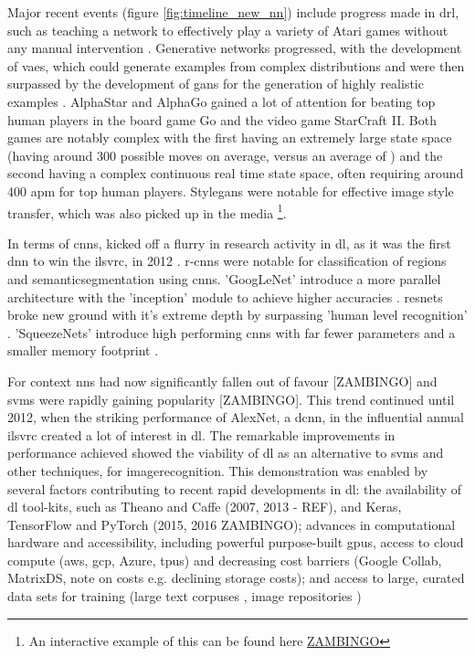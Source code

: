 Major recent events (figure \ref{fig:timeline_new_nn}) include progress made in \gls{drl}, such as teaching a network to effectively play a variety of Atari games without any manual intervention \cite{drl_atari}. Generative networks progressed, with the development of \gls{vae}s, which could generate examples from complex distributions and were then surpassed by the development of \gls{gan}s for the generation of highly realistic examples \cite{gan}. AlphaStar  \cite{alpha_star} and AlphaGo \cite{alpha_go} gained a lot of attention \cite{press_alpha_go} \cite{press_alpha_star} for beating top human players in the board game Go and the video game StarCraft II. Both games are notably complex with the first having an extremely large state space (having around 300 possible moves on average, versus an average of \cite{moves_chess_go}) and the second having a complex continuous real time state space, often requiring  around 400 \gls{apm} \cite{sc_apm} for top human players. Style\gls{gan}s were notable for effective image style transfer, which was also picked up in the media \cite{press_stylegan} \footnote{An interactive example of this can be found here \url{ZAMBINGO}}.

In terms of \gls{cnn}s, kicked off a flurry in research activity in \gls{dl}, as it was the first \gls{dnn} to win the \gls{ilsvrc}, in 2012 \cite{alex_net}. \gls{r-cnn}s were notable for classification of regions and \gls{semanticsegmentation} using \gls{cnn}s. 'GoogLeNet' introduce a more parallel architecture with the 'inception' module to achieve higher accuracies \cite{googlenet}. \gls{resnet}s broke new ground with it's extreme depth \cite{resnet} by surpassing 'human level recognition' \cite{resnet_human}. 'SqueezeNets' introduce high performing \gls{cnn}s with far fewer parameters and a smaller memory footprint \cite{squeeze_net}. 
\bigskip

For context \gls{nn}s had now significantly fallen out of favour [ZAMBINGO] and \gls{svm}s were rapidly gaining popularity [ZAMBINGO]. This trend continued until 2012, when the striking performance of AlexNet, a \gls{dcnn}, in the influential annual \gls{ilsvrc} created a lot of interest in \gls{dl}. The remarkable improvements in performance achieved showed the viability of \gls{dl} as an alternative to \gls{svm}s and other techniques, for \gls{imagerecognition}. This demonstration was enabled by several factors contributing to recent rapid developments in \gls{dl}: the availability of \gls{dl} tool-kits, such as Theano and Caffe (2007, 2013 - REF), and Keras, TensorFlow and PyTorch (2015, 2016 ZAMBINGO); advances in computational hardware and accessibility, including powerful purpose-built \gls{gpu}s, access to cloud compute (\gls{aws}, \gls{gcp}, Azure, \gls{tpu}s) and decreasing cost barriers (Google Collab, MatrixDS, note on costs e.g. declining storage costs); and access to large, curated data sets for training (large text corpuses \cite{enron_emails}, image repositories \cite{image_net}) \bigskip

